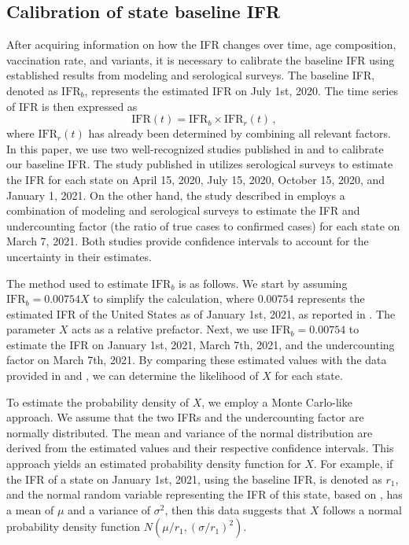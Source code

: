 \documentclass[sn-mathphys,Numbered]{sn-jnl}
\begin{document}
\subsection{Calibration of state baseline IFR}
After acquiring information on how the IFR changes over time, age composition, vaccination rate, and variants, it is necessary to calibrate the baseline IFR using established results from modeling and serological surveys. The baseline IFR, denoted as $\mathrm{IFR}_b$, represents the estimated IFR on July 1st, 2020. The time series of IFR is then expressed as
$$
\mbox{IFR}(t) = \mbox{IFR}_b \times \mbox{IFR}_r (t) \,,
$$
where $\mathrm{IFR}_r(t)$ has already been determined by combining all relevant factors. In this paper, we use two well-recognized studies published in \cite{IHME} and \cite{TrueInfection1} to calibrate our baseline IFR. The study published in \cite{IHME} utilizes serological surveys to estimate the IFR for each state on April 15, 2020, July 15, 2020, October 15, 2020, and January 1, 2021. On the other hand, the study described in \cite{TrueInfection1} employs a combination of modeling and serological surveys to estimate the IFR and undercounting factor (the ratio of true cases to confirmed cases) for each state on March 7, 2021. Both studies provide confidence intervals to account for the uncertainty in their estimates.

The method used to estimate $\mathrm{IFR}_b$ is as follows. We start by assuming $\mathrm{IFR}_b = 0.00754X$ to simplify the calculation, where $0.00754$ represents the estimated IFR of the United States as of January 1st, 2021, as reported in \cite{IHME}. The parameter $X$ acts as a relative prefactor. Next, we use $\mathrm{IFR}_b = 0.00754$ to estimate the IFR on January 1st, 2021, March 7th, 2021, and the undercounting factor on March 7th, 2021. By comparing these estimated values with the data provided in \cite{IHME} and \cite{TrueInfection1}, we can determine the likelihood of $X$ for each state.

To estimate the probability density of $X$, we employ a Monte Carlo-like approach. We assume that the two IFRs and the undercounting factor are normally distributed. The mean and variance of the normal distribution are derived from the estimated values and their respective confidence intervals. This approach yields an estimated probability density function for $X$. For example, if the IFR of a state on January 1st, 2021, using the baseline IFR, is denoted as $r_1$, and the normal random variable representing the IFR of this state, based on \cite{IHME}, has a mean of $\mu$ and a variance of $\sigma^2$, then this data suggests that $X$ follows a normal probability density function $N(\mu/r_1, (\sigma/r_1)^2 )$.
\end{document}
